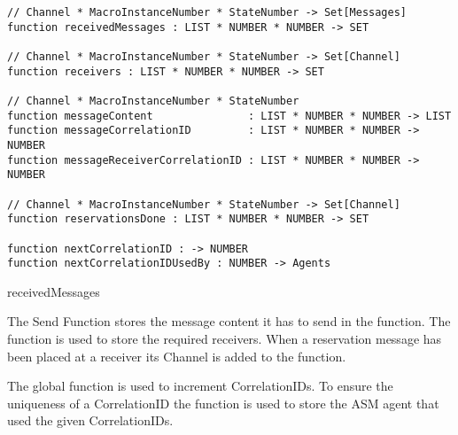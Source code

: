 \begin{listing}[H]
\begin{verbatim}
// Channel * MacroInstanceNumber * StateNumber -> Set[Messages]
function receivedMessages : LIST * NUMBER * NUMBER -> SET

// Channel * MacroInstanceNumber * StateNumber -> Set[Channel]
function receivers : LIST * NUMBER * NUMBER -> SET

// Channel * MacroInstanceNumber * StateNumber
function messageContent               : LIST * NUMBER * NUMBER -> LIST
function messageCorrelationID         : LIST * NUMBER * NUMBER -> NUMBER
function messageReceiverCorrelationID : LIST * NUMBER * NUMBER -> NUMBER

// Channel * MacroInstanceNumber * StateNumber -> Set[Channel]
function reservationsDone : LIST * NUMBER * NUMBER -> SET

function nextCorrelationID : -> NUMBER
function nextCorrelationIDUsedBy : NUMBER -> Agents
\end{verbatim}
\caption{receivedMessages}
\label{lst:shortasm:receivedMessages}
\end{listing}


The Send Function stores the message content it has to send in the
 function. The  function is
used to store the required receivers. When a reservation message has been
placed at a receiver its Channel is added to the 
function.

The global function  is used to increment
CorrelationIDs. To ensure the uniqueness of a CorrelationID the
 function is used to store the ASM agent
that used the given CorrelationIDs.


